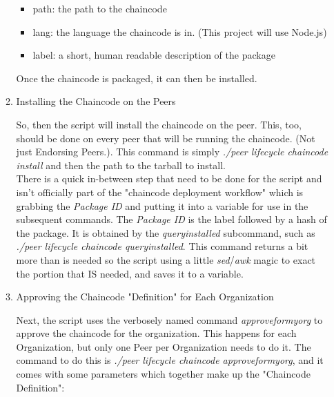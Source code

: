 \begin{itemize}
\begin{enumerate}
									\begin{itemize}
										\item path: the path to the chaincode
										\item lang: the language the chaincode is in. (This project will use Node.js)
										\item label: a short, human readable description of the package
									\end{itemize}							
								
								\hspace{10mm}Once the chaincode is packaged, it can then be installed.
								
							\item Installing the Chaincode on the Peers

								\hspace{10mm}So, then the script will install the chaincode on the peer. This, too, should be done on every peer that will be running the chaincode. (Not just Endorsing Peers.). This command is simply \textit{./peer lifecycle chaincode install} and then the path to the tarball to install.\\
								
								\hspace{10mm}There is a quick in-between step that need to be done for the script and isn't officially part of the "chaincode deployment workflow" which is grabbing the \textit{Package ID} and putting it into a variable for use in the subsequent commands. The \textit{Package ID} is the label followed by a hash of the package. It is obtained by the \textit{queryinstalled} subcommand, such as \textit{./peer lifecycle chaincode queryinstalled}. This command returns a bit more than is needed so the script using a little \textit{sed}/\textit{awk} magic to exact the portion that IS needed, and saves it to a variable. 
							
							\item Approving the Chaincode "Definition" for Each Organization
							
							\hspace{10mm}Next, the script uses the verbosely named command \textit{approveformyorg} to approve the chaincode for the organization. This happens for each Organization, but only one Peer per Organization needs to do it. The command to do this is \textit{./peer lifecycle chaincode approveformyorg}, and it comes with some parameters which together make up the "Chaincode Definition":
							

\end{enumerate}
\end{itemize}
